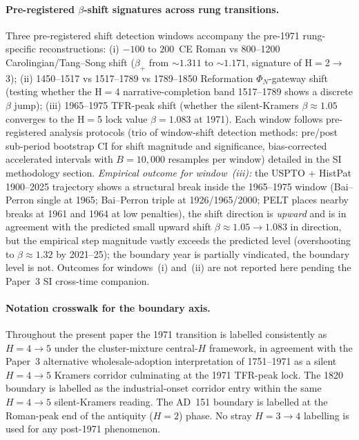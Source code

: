 \paragraph{Pre-registered $\beta$-shift signatures across rung transitions.} Three pre-registered shift detection windows accompany the pre-1971 rung-specific reconstructions: (i) $-100$ to $200$~CE Roman vs 800--1200 Carolingian/Tang--Song shift ($\beta_+$ from $\sim 1.311$ to $\sim 1.171$, signature of H${=}$2$\to$3); (ii) 1450--1517 vs 1517--1789 vs 1789--1850 Reformation $\Phi_N$-gateway shift (testing whether the H${=}$4 narrative-completion band 1517--1789 shows a discrete $\beta$ jump); (iii) 1965--1975 TFR-peak shift (whether the silent-Kramers $\beta\approx 1.05$ converges to the H${=}$5 lock value $\beta=1.083$ at 1971). Each window follows pre-registered analysis protocols (trio of window-shift detection methods: pre/post sub-period bootstrap CI for shift magnitude and significance, bias-corrected accelerated intervals with $B=10{,}000$ resamples per window) detailed in the SI methodology section. \emph{Empirical outcome for window~(iii):} the USPTO + HistPat 1900--2025 trajectory shows a structural break inside the 1965--1975 window (Bai--Perron single at 1965; Bai--Perron triple at 1926/1965/2000; PELT places nearby breaks at 1961 and 1964 at low penalties), the shift direction is \emph{upward} and is in agreement with the predicted small upward shift $\beta\!\approx\!1.05\!\to\!1.083$ in direction, but the empirical step magnitude vastly exceeds the predicted level (overshooting to $\beta\!\approx\!1.32$ by 2021--25); the boundary year is partially vindicated, the boundary level is not. Outcomes for windows~(i) and~(ii) are not reported here pending the Paper~3 SI cross-time companion.

\paragraph{Notation crosswalk for the boundary axis.}
Throughout the present paper the 1971 transition is labelled consistently as \(H=4\to5\) under the cluster-mixture central-\(H\) framework, in agreement with the Paper~3 alternative wholesale-adoption interpretation of 1751--1971 as a silent \(H=4\to5\) Kramers corridor culminating at the 1971 TFR-peak lock. The 1820 boundary is labelled as the industrial-onset corridor entry within the same \(H=4\to5\) silent-Kramers reading. The AD~151 boundary is labelled at the Roman-peak end of the antiquity (\(H=2\)) phase. No stray \(H=3\to4\) labelling is used for any post-1971 phenomenon.

